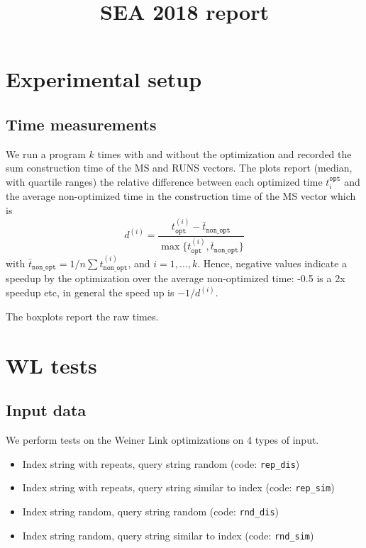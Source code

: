 \documentclass[]{article}
\title{SEA 2018 report}
\author{}
\date{}
\providecommand{\tightlist}{%
  \setlength{\itemsep}{0pt}\setlength{\parskip}{0pt}}
\begin{document}
\maketitle

{
\setcounter{tocdepth}{2}
\tableofcontents
}
\section{Experimental setup}\label{experimental-setup}

\subsection{Time measurements}\label{time-measurements}

We run a program \(k\) times with and without the optimization and
recorded the sum construction time of the MS and RUNS vectors. The plots
report (median, with quartile ranges) the relative difference between
each optimized time \(t_i^{\mathtt{opt}}\) and the average non-optimized
time in the construction time of the MS vector which is \[
d^{(i)} = \frac{t^{(i)}_{\mathtt{opt}} - \bar{t}_{\mathtt{non\_opt}}}{\max\{t^{(i)}_{\mathtt{opt}}, \bar{t}_{\mathtt{non\_opt}}\}}
\] with
\(\bar{t}_{\mathtt{non\_opt}} = 1/n \sum t^{(i)}_{\mathtt{non\_opt}}\),
and \(i = 1, \ldots, k\). Hence, negative values indicate a speedup by
the optimization over the average non-optimized time: -0.5 is a 2x
speedup etc, in general the speed up is \(-1/d^{(i)}\).

The boxplots report the raw times.

\section{WL tests}\label{wl-tests}

\subsection{Input data}\label{input-data}

We perform tests on the Weiner Link optimizations on 4 types of input.

\begin{itemize}
\tightlist
\item
  Index string with repeats, query string random (code:
  \texttt{rep\_dis})
\item
  Index string with repeats, query string similar to index (code:
  \texttt{rep\_sim})
\item
  Index string random, query string random (code: \texttt{rnd\_dis})
\item
  Index string random, query string similar to index (code:
  \texttt{rnd\_sim})
\end{itemize}
\end{document}
